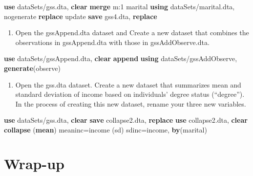 \documentclass[]{book}
\newenvironment{Shaded}{\begin{snugshade}}{\end{snugshade}}
\newcommand{\FunctionTok}[1]{\textcolor[rgb]{0.00,0.00,0.00}{#1}}
\newcommand{\KeywordTok}[1]{\textcolor[rgb]{0.13,0.29,0.53}{\textbf{#1}}}
\newcommand{\NormalTok}[1]{#1}
\providecommand{\tightlist}{%
  \setlength{\itemsep}{0pt}\setlength{\parskip}{0pt}}
\begin{document}
\begin{Shaded}
\begin{Highlighting}[]
  \KeywordTok{use}\NormalTok{ dataSets/gss.dta, }\KeywordTok{clear}
  \KeywordTok{merge} \FunctionTok{m}\NormalTok{:1 marital }\KeywordTok{using}\NormalTok{ dataSets/marital.dta, nogenerate }\KeywordTok{replace}\NormalTok{ update}
  \KeywordTok{save}\NormalTok{ gss4.dta, }\KeywordTok{replace}
\end{Highlighting}
\end{Shaded}

\begin{enumerate}
\def\labelenumi{\arabic{enumi}.}
\setcounter{enumi}{2}
\tightlist
\item
  Open the gssAppend.dta dataset and Create a new dataset that combines the observations in gssAppend.dta with those in gssAddObserve.dta.
\end{enumerate}

\begin{Shaded}
\begin{Highlighting}[]
  \KeywordTok{use}\NormalTok{ dataSets/gssAppend.dta, }\KeywordTok{clear}
  \KeywordTok{append} \KeywordTok{using}\NormalTok{ dataSets/gssAddObserve, }\KeywordTok{generate}\NormalTok{(observe) }
\end{Highlighting}
\end{Shaded}

\begin{enumerate}
\def\labelenumi{\arabic{enumi}.}
\setcounter{enumi}{3}
\tightlist
\item
  Open the gss.dta dataset. Create a new dataset that summarizes mean and standard deviation of income based on individuals' degree status (``degree''). In the process of creating this new dataset, rename your three new variables.
\end{enumerate}

\begin{Shaded}
\begin{Highlighting}[]
  \KeywordTok{use}\NormalTok{ dataSets/gss.dta, }\KeywordTok{clear}
  \KeywordTok{save}\NormalTok{ collapse2.dta, }\KeywordTok{replace}
  \KeywordTok{use}\NormalTok{ collapse2.dta, }\KeywordTok{clear}
  \KeywordTok{collapse}\NormalTok{ (}\KeywordTok{mean}\NormalTok{) meaninc=income (}\FunctionTok{sd}\NormalTok{) sdinc=income, }\KeywordTok{by}\NormalTok{(marital)}
\end{Highlighting}
\end{Shaded}

\hypertarget{wrap-up-8}{%
\section{Wrap-up}\label{wrap-up-8}}
\end{document}
